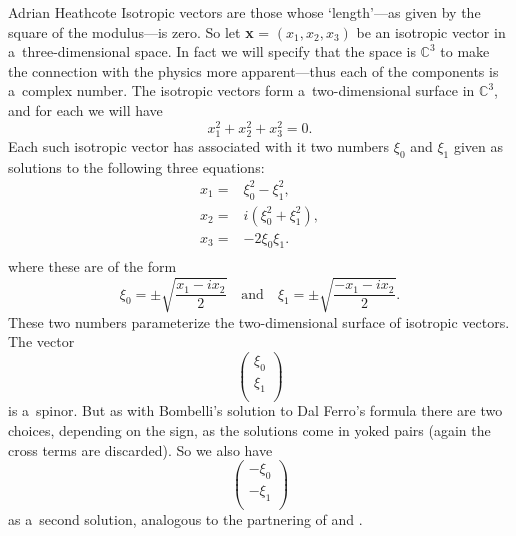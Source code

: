 \begin{artengenv}{Adrian Heathcote}
Isotropic vectors are those whose `length'---as given by the square of the modulus---is zero. So let \textbf{x} = $(x_{1}, x_{2}, x_{3})$ be an isotropic vector in a~three-dimensional space. In fact we will specify that the space is $\mathbb{C}^{3}$ to make the connection with the physics more apparent---thus each of the components is a~complex number. The isotropic vectors form a~two-dimensional surface in $\mathbb{C}^{3}$, and for each we will have $$x_{1}^{2} + x_{2}^{2} + x_{3}^{2} = 0.$$ Each such isotropic vector has associated with it two numbers $\xi_{0}$ and $\xi_{1}$ given as solutions to the following three equations: \[  \begin{array}{cc}
x_{1} = & \xi_{0}^{2} - \xi_{1}^{2},   \\[2.0mm]
x_{2} =  & i(\xi_{0}^{2} + \xi_{1}^{2}), \\[2.0mm]
x_{3} =  & -2 \xi_{0} \xi_{1}. \\
 \end{array} \] 
where these are of the form $$\xi_{0} = \pm \sqrt{\frac{x_{1} - ix_{2}}{2}}\quad \mbox{and}\quad  \xi_{1} = \pm \sqrt{\frac{- x_{1} - ix_{2}}{2}}.$$ These two numbers parameterize the two-dimensional surface of isotropic vectors. The vector  \[ \left( \begin{array}{c}
\xi_{0} \\
\xi_{1} \\ \end{array} \right)\] 
is a~spinor. But as with Bombelli's solution to Dal Ferro's formula there are two choices, depending on the sign, as the solutions come in yoked pairs (again the cross terms are discarded). So we also have
\[ \left( \begin{array}{c}
- \xi_{0} \\
- \xi_{1} \\ \end{array} \right)\] as a~second solution, analogous to the partnering of  and .


\end{artengenv}
